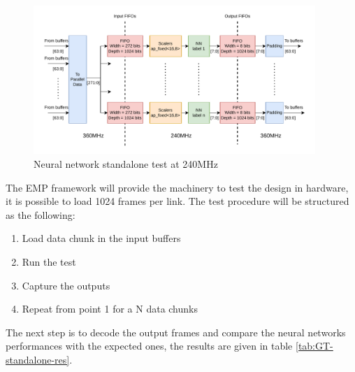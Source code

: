 \documentclass[../../main.tex]{subfiles}
\begin{document}
\begin{figure}[h]
    \centering
    \includegraphics[width=0.95\textwidth]{sections/05/Images/GT_NN_standalone.pdf}
    \caption{Neural network standalone test at 240MHz}
    \label{fig:GT-standalone-diag}
\end{figure}

The EMP framework will provide the machinery to test the design in hardware, it is possible to load 1024 frames per link. The test procedure will be structured as the following:
\begin{enumerate}
    \item Load data chunk in the input buffers
    \item Run the test
    \item Capture the outputs
    \item Repeat from point 1 for a N data chunks
\end{enumerate}

The next step is to decode the output frames and compare the neural networks performances with the expected ones, the results are given in table \ref{tab:GT-standalone-res}.
\end{document}
